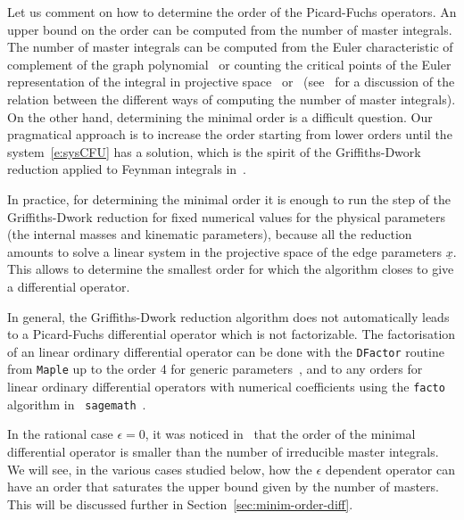 \documentclass[a4paper,12pt]{article}
\numberwithin{equation}{section}
\numberwithin{figure}{section}
\begin{document}
 Let us comment on how to determine the order of the Picard-Fuchs operators. An upper bound on the order can be computed
 from the number of master integrals.
 The number of master
integrals  can be computed from the Euler
characteristic of complement of the graph polynomial~\cite{Bitoun:2017nre} or counting the
critical points of the Euler representation of the integral in
projective
space~\cite{Lee:2013hzt,Cacciatori:2021nli}
or~\cite{Mastrolia:2018uzb,Frellesvig:2019uqt} (see~\cite{Agostini:2022cgv} for
a discussion of the relation between the different ways of computing the number of master
integrals). On the other hand, determining the minimal order is a
difficult question. Our pragmatical approach is to increase the order
starting from 
lower orders until the system~\eqref{e:sysCFU} has a solution, which is
the spirit of the Griffiths-Dwork reduction applied to Feynman
integrals in~\cite{Muller-Stach:2011qkg}.

In practice, for determining the minimal order it is enough to run the step of the
Griffiths-Dwork reduction for fixed numerical values for the physical
parameters (the internal masses and kinematic
parameters), because all the reduction amounts to solve a linear system in the projective space of
the edge parameters $\underline x$. This allows to determine the smallest order for which the
algorithm closes to give a differential operator.

In general, the Griffiths-Dwork reduction algorithm does not automatically
leads to a Picard-Fuchs differential operator  which is not factorizable. 
The factorisation of an linear ordinary
differential operator can be done with the {\tt DFactor} routine from
{\tt Maple} up to the order 4 for generic parameters~\cite{PutSinger,vanHoeij}, and to any
orders for linear  ordinary
differential operators with numerical coefficients
using the {\tt facto} algorithm in {\tt
	sagemath}~\cite{chyzak2022symbolic,goyer2021sage}.


 In the rational case $\epsilon=0$, it was noticed
in~\cite{Bloch:2013tra,Bloch:2016izu,Bloch:2014qca,Lairez:2022zkj} that the order of the minimal differential operator is
smaller than the number of irreducible master integrals. We will see,
in the various cases studied below, 
how the $\epsilon$ dependent operator can have an order that saturates
the upper bound given by the number of masters.  This will
      be discussed further in Section~\ref{sec:minim-order-diff}.


\end{document}
